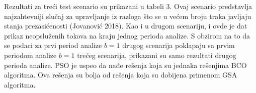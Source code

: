 Rezultati za treći test scenario su prikazani u tabeli 3. Ovaj scenario predstavlja najzahtevniji slučaj za upravljanje iz razloga što se u većem broju traka javljaju stanja prezasićenosti (Jovanović 2018). Kao i u drugom scenariju, i ovde je dat prikaz neopsluženih tokova na kraju jednog perioda analize. S obzirom na to da se podaci za prvi period analize $b=1$ drugog scenarija poklapaju sa prvim periodom analize $b=1$ trećeg scenarija, prikazani su samo rezultati drugog perioda analize. PSO je uspeo da nađe rešenja koja su jednaka rešenjima BCO algoritma. Ova rešenja su bolja od rešenja koja su dobijena primenom GSA algoritma. 









